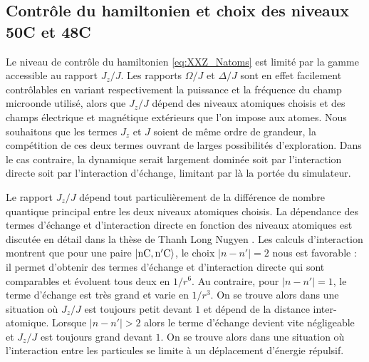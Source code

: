 	\subsection*{Contrôle du hamiltonien et choix des niveaux 50C et 48C}
\noindent Le niveau de contrôle du hamiltonien \eqref{eq:XXZ_Natoms} est limité par la gamme accessible au rapport $J_z/J$.
Les rapports $\Omega/J$ et $\Delta/J$ sont en effet facilement contrôlables en variant respectivement la puissance et la fréquence du champ microonde utilisé, alors que $J_z/J$ dépend des niveaux atomiques choisis et des champs électrique et magnétique extérieurs que l'on impose aux atomes.
Nous souhaitons que les termes $J_z$ et $J$ soient de même ordre de grandeur, la compétition de ces deux termes ouvrant de larges possibilités d'exploration.
Dans le cas contraire, la dynamique serait largement dominée soit par l'interaction directe soit par l'interaction d'échange, limitant par là la portée du simulateur.

Le rapport $J_z/J$ dépend tout particulièrement de la différence de nombre quantique principal entre les deux niveaux atomiques choisis.
La dépendance des termes d'échange et d'interaction directe en fonction des niveaux atomiques est discutée en détail dans la thèse de Thanh Long Nugyen \cite{PHD_NGUYEN}.
Les calculs d'interaction montrent que pour une paire $\ket{\mathrm{nC},\mathrm{n'C}}$, 
le choix $|n-n'|=2$ nous est favorable : il permet d'obtenir des termes d'échange et d'interaction directe qui sont comparables et évoluent tous deux en $1/r^6$.
Au contraire, pour $|n-n'|=1$, le terme d'échange est très grand et varie en $1/r^3$.
On se trouve alors dans une situation où $J_z/J$ est toujours petit devant $1$ et dépend de la distance inter-atomique.
Lorsque $|n-n'|>2$ alors le terme d'échange devient vite négligeable et $J_z/J$ est toujours grand devant $1$.
On se trouve alors dans une situation où l'interaction entre les particules se limite à un déplacement d'énergie répulsif.


